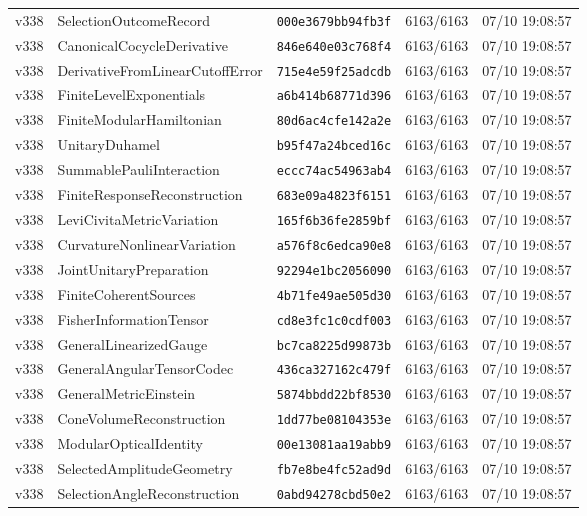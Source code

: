 \documentclass[11pt]{article}
\theoremstyle{definition}\newtheorem{deriv}{Derivation}
\begin{document}
{\begin{longtable}{@{}lllll@{}}
v338 & SelectionOutcomeRecord & \texttt{000e3679bb94fb3f} & 6163/6163 & 07/10 19:08:57 \\
v338 & CanonicalCocycleDerivative & \texttt{846e640e03c768f4} & 6163/6163 & 07/10 19:08:57 \\
v338 & DerivativeFromLinearCutoffError & \texttt{715e4e59f25adcdb} & 6163/6163 & 07/10 19:08:57 \\
v338 & FiniteLevelExponentials & \texttt{a6b414b68771d396} & 6163/6163 & 07/10 19:08:57 \\
v338 & FiniteModularHamiltonian & \texttt{80d6ac4cfe142a2e} & 6163/6163 & 07/10 19:08:57 \\
v338 & UnitaryDuhamel & \texttt{b95f47a24bced16c} & 6163/6163 & 07/10 19:08:57 \\
v338 & SummablePauliInteraction & \texttt{eccc74ac54963ab4} & 6163/6163 & 07/10 19:08:57 \\
v338 & FiniteResponseReconstruction & \texttt{683e09a4823f6151} & 6163/6163 & 07/10 19:08:57 \\
v338 & LeviCivitaMetricVariation & \texttt{165f6b36fe2859bf} & 6163/6163 & 07/10 19:08:57 \\
v338 & CurvatureNonlinearVariation & \texttt{a576f8c6edca90e8} & 6163/6163 & 07/10 19:08:57 \\
v338 & JointUnitaryPreparation & \texttt{92294e1bc2056090} & 6163/6163 & 07/10 19:08:57 \\
v338 & FiniteCoherentSources & \texttt{4b71fe49ae505d30} & 6163/6163 & 07/10 19:08:57 \\
v338 & FisherInformationTensor & \texttt{cd8e3fc1c0cdf003} & 6163/6163 & 07/10 19:08:57 \\
v338 & GeneralLinearizedGauge & \texttt{bc7ca8225d99873b} & 6163/6163 & 07/10 19:08:57 \\
v338 & GeneralAngularTensorCodec & \texttt{436ca327162c479f} & 6163/6163 & 07/10 19:08:57 \\
v338 & GeneralMetricEinstein & \texttt{5874bbdd22bf8530} & 6163/6163 & 07/10 19:08:57 \\
v338 & ConeVolumeReconstruction & \texttt{1dd77be08104353e} & 6163/6163 & 07/10 19:08:57 \\
v338 & ModularOpticalIdentity & \texttt{00e13081aa19abb9} & 6163/6163 & 07/10 19:08:57 \\
v338 & SelectedAmplitudeGeometry & \texttt{fb7e8be4fc52ad9d} & 6163/6163 & 07/10 19:08:57 \\
v338 & SelectionAngleReconstruction & \texttt{0abd94278cbd50e2} & 6163/6163 & 07/10 19:08:57 \\

\end{longtable}}
\end{document}
